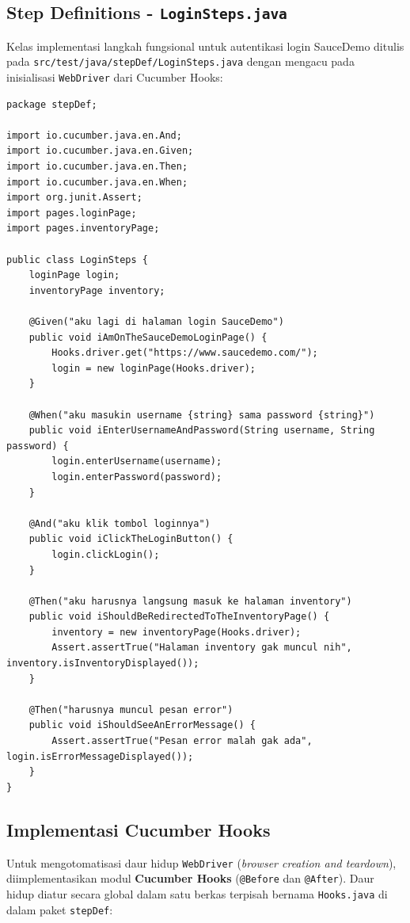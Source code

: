 \documentclass[a4paper,oneside,12pt]{report}
\begin{document}
\subsection{Step Definitions - \texttt{LoginSteps.java}}
Kelas implementasi langkah fungsional untuk autentikasi login SauceDemo ditulis pada \texttt{src/test/java/stepDef/LoginSteps.java} dengan mengacu pada inisialisasi \texttt{WebDriver} dari Cucumber Hooks:
\begin{lstlisting}[style=javastyle, caption={Implementasi Kelas Langkah Uji LoginSteps.java}]
package stepDef;

import io.cucumber.java.en.And;
import io.cucumber.java.en.Given;
import io.cucumber.java.en.Then;
import io.cucumber.java.en.When;
import org.junit.Assert;
import pages.loginPage;
import pages.inventoryPage;

public class LoginSteps {
    loginPage login;
    inventoryPage inventory;

    @Given("aku lagi di halaman login SauceDemo")
    public void iAmOnTheSauceDemoLoginPage() {
        Hooks.driver.get("https://www.saucedemo.com/");
        login = new loginPage(Hooks.driver);
    }

    @When("aku masukin username {string} sama password {string}")
    public void iEnterUsernameAndPassword(String username, String password) {
        login.enterUsername(username);
        login.enterPassword(password);
    }

    @And("aku klik tombol loginnya")
    public void iClickTheLoginButton() {
        login.clickLogin();
    }

    @Then("aku harusnya langsung masuk ke halaman inventory")
    public void iShouldBeRedirectedToTheInventoryPage() {
        inventory = new inventoryPage(Hooks.driver);
        Assert.assertTrue("Halaman inventory gak muncul nih", inventory.isInventoryDisplayed());
    }

    @Then("harusnya muncul pesan error")
    public void iShouldSeeAnErrorMessage() {
        Assert.assertTrue("Pesan error malah gak ada", login.isErrorMessageDisplayed());
    }
}
\end{lstlisting}

\clearpage

\subsection{Implementasi Cucumber Hooks}
Untuk mengotomatisasi daur hidup \texttt{WebDriver} (\textit{browser creation and teardown}), diimplementasikan modul \textbf{Cucumber Hooks} (\texttt{@Before} dan \texttt{@After}). Daur hidup diatur secara global dalam satu berkas terpisah bernama \texttt{Hooks.java} di dalam paket \texttt{stepDef}:
\end{document}
